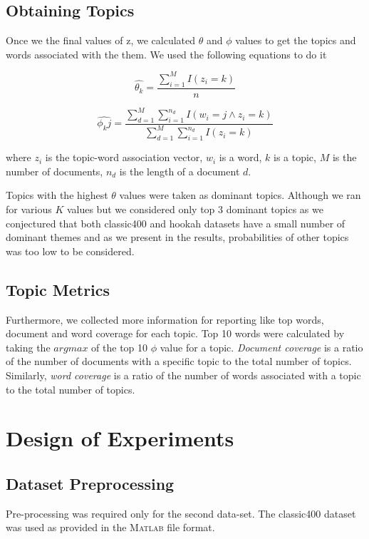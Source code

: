\documentclass[11pt,a4paper,oneside]{article}
\begin{document}
\subsection{Obtaining Topics}
Once we the final values of z, we calculated $\theta$ and $\phi$ values to get the topics and words associated with the them. We used the following equations \cite{classNotes} to do it

\begin{equation}
\hat{\theta_k} = \frac{\sum^M_{i=1}{I(z_i=k)}}{n}
\end{equation}

\begin{equation}
\hat{\phi_kj} = \frac{\sum^M_{d=1}{\sum^{n_d}_{i=1}{I(w_i=j \land z_i = k)}}}{\sum^M_{d=1}{\sum^{n_d}_{i=1}{I(z_i = k)}}}
\end{equation}

where $z_i$ is the topic-word association vector, $w_i$ is  a word, $k$ is a topic, $M$ is the number of documents, $n_d$ is the length of a document $d$.

Topics with the highest $\theta$ values were taken as dominant topics. Although we ran for various $K$ values but we considered only top 3 dominant topics as we conjectured that both classic400 and hookah datasets have a small number of dominant themes and as we present in the results, probabilities of other topics was too low to be considered.

\subsection{Topic Metrics}
Furthermore, we collected more information for reporting like top words, document and word coverage for each topic. Top 10 words were calculated by taking the $argmax$ of the top 10 $\phi$ value for a topic. \textit{Document coverage} is a ratio of the number of documents with a specific topic to the total number of topics. Similarly, \textit{word coverage} is a ratio of the number of words associated with a topic to the total number of topics.

\section{Design of Experiments}
\label{sec:Experiments}

\subsection{Dataset Preprocessing}
Pre-processing was required only for the second data-set. The classic400 dataset was used as provided in the \textsc{Matlab} file format.
\end{document}
